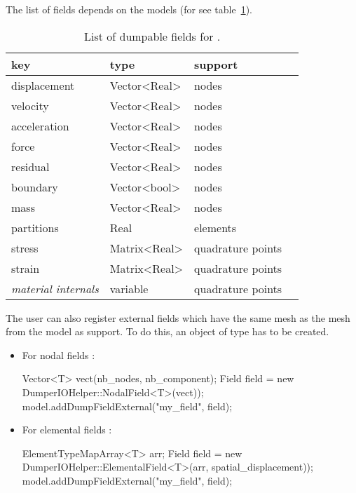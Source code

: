 The list of fields depends on the models (for
 see table~\ref{tab:io:smm_field_list}).

\begin{table}
  \centering
  \begin{tabular}{llll}
    \toprule
    key          &    type      & support \\
    \midrule
    displacement & Vector<Real> & nodes  \\
    velocity     & Vector<Real> & nodes  \\
    acceleration & Vector<Real> & nodes  \\
    force	       & Vector<Real> & nodes  \\
    residual     & Vector<Real> & nodes  \\
    boundary     & Vector<bool> & nodes  \\
    mass         & Vector<Real> & nodes  \\
    partitions   & Real         & elements \\
    stress & Matrix<Real> & quadrature points  \\
    strain & Matrix<Real> & quadrature points  \\
    \textit{material internals} & variable  & quadrature points  \\
    \bottomrule
  \end{tabular}
  \caption{List of dumpable fields for .}
  \label{tab:io:smm_field_list}
\end{table}

The user can also register external fields which have the same mesh as the mesh from the model as support. To do this, an object of type  has to be created.

\begin{itemize}
\item For nodal fields :
\begin{cpp}
  Vector<T> vect(nb_nodes, nb_component);
  Field field = new DumperIOHelper::NodalField<T>(vect));
  model.addDumpFieldExternal("my_field", field);
\end{cpp}

\item For elemental fields :
\begin{cpp}
  ElementTypeMapArray<T> arr;
  Field field = new DumperIOHelper::ElementalField<T>(arr, spatial_displacement));
  model.addDumpFieldExternal("my_field", field);
\end{cpp}
\end{itemize}

